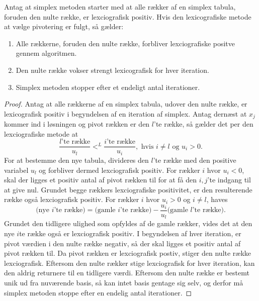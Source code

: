 \begin{thm}{}{}
Antag at simplex metoden starter med at alle rækker af en simplex tabula, foruden den nulte række, er lexciografisk positiv. Hvis den lexicografiske metode at vælge pivotering er fulgt, så gælder:
\begin{enumerate}[label=(\alph*)]
\item Alle rækkerne, foruden den nulte række, forbliver lexciografiske positve gennem algoritmen.
\item Den nulte række vokser strengt lexicografisk for hver iteration.
\item Simplex metoden stopper efter et endeligt antal iterationer. 
\end{enumerate}
\end{thm}
%
\begin{proof}
Antag at alle rækkerne af en simplex tabula, udover den nulte række, er lexicografisk positiv i begyndelsen af en iteration af simplex. 
Antag dernæst at $x_j$ kommer ind i løsningen og pivot rækken er den $l$'te række, så gælder det per den lexciografiske metode at
$$\dfrac{l\text{'te række}}{u_l}<^L \dfrac{i\text{'te række}}{u_i}, \text{  hvis } i\neq l \text{ og }u_i>0.$$
For at bestemme den nye tabula, divideres den $l$'te række med den positive variabel $u_l$ og forbliver dermed lexciografisk positiv.
For rækker $i$ hvor $u_i<0$, skal der ligges et positiv antal af pivot rækken til for at få den $i,j$'te indgang til at give nul. 
Grundet begge rækkers lexciografiske positivitet, er den resulterende række også lexciografisk positiv.
For rækker $i$ hvor $u_i>0$ og $i\neq l$, haves
$$\text{(nye }i\text{'te række)}=\text{(gamle }i\text{'te række)}-\dfrac{u_i}{u_l}\text{(gamle }l\text{'te række)}.$$
Grundet den tidligere ulighed som opfyldes af de gamle rækker, vides det at den nye $i$te række også er lexciografisk positiv.
%
I begyndelsen af hver iteration, er pivot værdien i den nulte række negativ, så der skal ligges et positiv antal af pivot rækken til. 
Da pivot rækken er lexciografisk postiv, stiger den nulte række lexciografisk.
%
Eftersom den nulte rækker stige lexciografisk for hver iteration, kan den aldrig returnere til en tidligere værdi.
Eftersom den nulte række er bestemt unik ud fra nuværende basis, så kan intet basis gentage sig selv, og derfor må simplex metoden stoppe efter en endelig antal iterationer.
\end{proof}
%
%
%
%